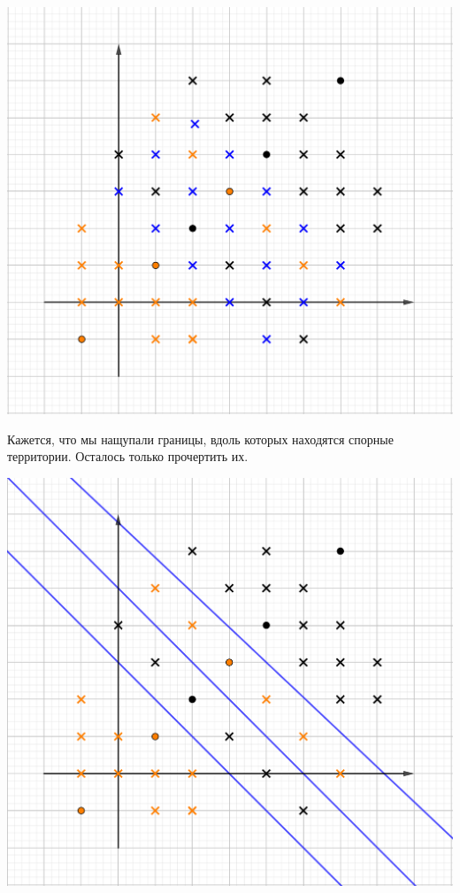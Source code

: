 \documentclass[12pt, a4paper, oneside]{article}
\begin{document}
{\begin{enumerate}
		\begin{center}
			\includegraphics[scale=0.18]{2knn_2.png}
		\end{center} 
		
		Кажется, что мы нащупали границы, вдоль которых находятся спорные территории. Осталось только прочертить их.	
		
		\begin{center}
			\includegraphics[scale=0.18]{2knn_3.png}
		\end{center} 
		

\end{enumerate}}
\end{document}
